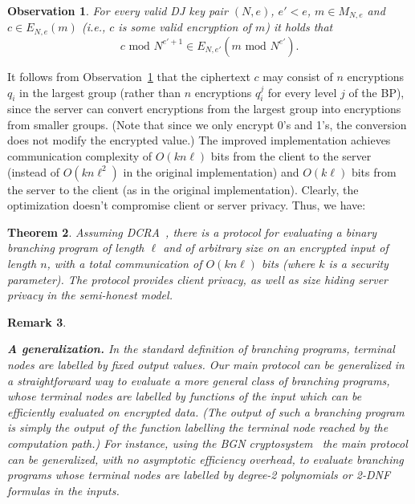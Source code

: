 \documentclass[11pt]{article}
\newtheorem{theorem}{Theorem}[section]{}
\newtheorem{Remark}[theorem]{Remark}
\newenvironment{remark}{\begin{Remark}\begin{rm}}{\end{rm}\end{Remark}}
\newtheorem{observation}[theorem]{Observation}
\renewcommand{\mod}{{\,\,\mathrm{mod}\,\,}}
\begin{document}
\begin{observation}
\label{obs-short} For every valid DJ key pair $(N,e)$, $e'<e$,
$m\in M_{N,e}$ and $c\in{E_{N,e}(m)}$ (i.e., $c$ is some valid
encryption of $m$) it holds that \[ c\mod N^{e'+1} \in
E_{N,e'}(m\mod N^{e'}).\]
\end{observation}
It follows from Observation~\ref{obs-short} that the ciphertext $c$
may consist of $n$ encryptions $q_i$ in the largest group (rather
than $n$ encryptions $q_i^j$ for every level $j$ of the BP), since
the server can convert encryptions from the largest group into
encryptions from smaller groups. (Note that since we only encrypt
0's and 1's, the conversion does not modify the encrypted value.)
The improved implementation achieves communication complexity of
$O(kn\ell)$ bits from the client to the server (instead of
$O(kn\ell^2)$ in the original implementation) and $O(k\ell)$ bits
from the server to the client (as in the original implementation).
Clearly, the optimization doesn't compromise client or server
privacy. Thus, we have:

\begin{theorem}
Assuming DCRA~\cite{DJ01}, there is a protocol for evaluating a
binary branching program of length $\ell$ and of arbitrary size on
an encrypted input of length $n$, with a total communication of
$O(kn\ell)$ bits (where $k$ is a security parameter). The protocol
provides client privacy, as well as size hiding server privacy in
the semi-honest model.
\end{theorem}


\begin{remark}{\bf A generalization.}
In the standard definition of branching programs, terminal nodes
are labelled by fixed output values. Our main protocol can be
generalized in a straightforward way to evaluate a more general
class of branching programs, whose terminal nodes are labelled by
functions of the input which can be efficiently evaluated on
encrypted data. (The output of such a branching program is simply
the output of the function labelling the terminal node reached by
the computation path.) For instance, using the BGN
cryptosystem~\cite{BGN} the main protocol can be generalized, with
no asymptotic efficiency overhead, to evaluate branching programs
whose terminal nodes are labelled by degree-2 polynomials or 2-DNF
formulas in the inputs.
\end{remark}
\end{document}
